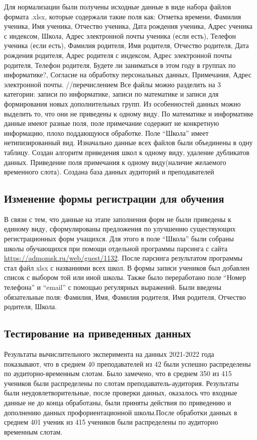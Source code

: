 Для нормализации  были получены исходные данные в виде набора файлов формата .xlsx, которые содержали такие поля как: Отметка времени, Фамилия ученика, Имя ученика, Отчество ученика, Дата рождения ученика, Адрес ученика с индексом, Школа, Адрес электронной почты ученика (если есть), Телефон ученика (если есть), Фамилия родителя, Имя родителя, Отчество родителя, Дата рождения родителя, Адрес родителя с индексом, Адрес электронной почты родителя, Телефон родителя, Будете ли заниматься в этом году в группах по информатике?, Согласие на обработку персональных данных, Примечания, Адрес электронной почты. //перечислением
Все файлы можно разделить на 3 категории: записи по информатике, записи по математике и записи для формирования новых дополнительных групп. Из особенностей данных можно выделить то, что они не приведены к одному виду. По математике и информатике данные имеют разные поля, поле примечание содержит не конкретную информацию, плохо поддающуюся обработке. Поле “Школа” имеет нетипизированный вид.
Изначально данные всех файлов были объединены в одну таблицу. Создан алгоритм приведения школ к одному виду, удаление дубликатов данных. Приведение поля примечания к одному виду(наличие желаемого временного слота). Создана база данных аудиторий и преподавателей

\subsection{Изменение формы регистрации для обучения }
\label{MACR-SubSecMD}

В связи с тем, что данные на этапе заполнения форм не были приведены к единому виду, сформулированы предложения по улучшению существующих регистрационных форм учащихся. Для этого в поле “Школа” были собраны школы обучающихся при помощи отдельной программы парсинга с сайта \href{https://admomsk.ru/web/guest/1132}{https://admomsk.ru/web/guest/1132}. После парсинга результатом программы стал файл xlsx с названиями всех школ. В формы записи учеников был добавлен список с выбором той или иной школы. Также было переработано поле “Номер телефона” и “email” с помощью регулярных выражений. Были введены обязательные поля: Фамилия, Имя, Фамилия родителя, Имя родителя, Отчество родителя, Школа.

\subsection{Тестирование на приведенных данных}
\label{MACR-SubSecMD}
Результаты вычислительного эксперимента на данных 2021-2022 года показывают, что в среднем 40 преподавателей из 42 были успешно распределены по аудиторно-временным слотам.  Было замечено, что в среднем 350 из 415 учеников были распределены по слотам преподаватель-аудитория. Результаты были неудовлетворительные, после проверки данных, оказалось что входные данные не до конца обработаны, были приняты действия по приведению и дополнению данных профориентационной школы.После обработки данных в среднем 401 ученик из 415 учеников были распределены по аудиторно временным слотам.






